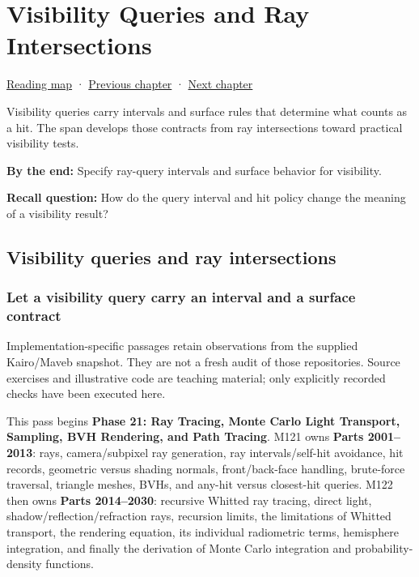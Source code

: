 \chapter{Visibility Queries and Ray Intersections}\label{04-visual-computing-ii-ch028-visibility-queries-and-ray-intersections}\hypertarget{04-visual-computing-ii-ch028}{}\label{stagechapter:04-visual-computing-ii-ch028}

\hyperref[volume-reading-map]{Reading map} · \hyperref[04-visual-computing-ii-ch027-mesh-queries-classification-and-clipping]{Previous chapter} · \hyperref[04-visual-computing-ii-ch029-acceleration-structures-and-robust-queries]{Next chapter}

Visibility queries carry intervals and surface rules that determine what counts as a hit. The span develops those contracts from ray intersections toward practical visibility tests.

\textbf{By the end:} Specify ray-query intervals and surface behavior for visibility.

\textbf{Recall question:} How do the query interval and hit policy change the meaning of a visibility result?

\section{Visibility queries and ray intersections}\label{04-visual-computing-ii-ch028-visibility-queries-and-ray-intersections-1}

\subsection{Let a visibility query carry an interval and a surface contract}\label{04-visual-computing-ii-ch028-let-a-visibility-query-carry-an-interval-and-a-surface-contract}

Implementation-specific passages retain observations from the supplied Kairo/Maveb snapshot. They are not a fresh audit of those repositories. Source exercises and illustrative code are teaching material; only explicitly recorded checks have been executed here.

This pass begins \textbf{Phase 21: Ray Tracing, Monte Carlo Light Transport, Sampling, BVH Rendering, and Path Tracing}. M121 owns \textbf{Parts 2001--2013}: rays, camera/subpixel ray generation, ray intervals/self-hit avoidance, hit records, geometric versus shading normals, front/back-face handling, brute-force traversal, triangle meshes, BVHs, and any-hit versus closest-hit queries. M122 then owns \textbf{Parts 2014--2030}: recursive Whitted ray tracing, direct light, shadow/reflection/refraction rays, recursion limits, the limitations of Whitted transport, the rendering equation, its individual radiometric terms, hemisphere integration, and finally the derivation of Monte Carlo integration and probability-density functions.

